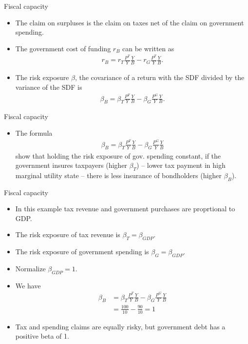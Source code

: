 \documentclass[11pt,xcolor={dvipsnames},aspectratio=159,hyperref={pdftex,pdfpagemode=UseNone,hidelinks,pdfdisplaydoctitle=true},usepdftitle=false]{beamer}
\begin{document}
\begin{frame}{Fiscal capacity}  
    \begin{itemize}
        \item The claim on surpluses is the claim on taxes net of the claim on government spending.
        \item The government cost of funding $r_B$ can be written as \begin{align*}
            r_B = r_T \frac{P^T}{Y}\frac{Y}{B} - r_G \frac{P^T}{Y}\frac{Y}{B}.
        \end{align*}
        \item The risk exposure $\beta$, the covariance of a return with the SDF divided by the variance of the SDF is \begin{align*}
            \beta_B = \beta_T \frac{P^T}{Y}\frac{Y}{B} - \beta_G \frac{P^G}{Y}\frac{Y}{B}. 
        \end{align*}
    \end{itemize}

\end{frame}

\begin{frame}{Fiscal capacity}  
    \begin{itemize}
        \item The formula \begin{align*}
            \beta_B = \beta_T \frac{P^T}{Y}\frac{Y}{B} - \beta_G \frac{P^G}{Y}\frac{Y}{B}
        \end{align*}
        show that holding the risk exposure of gov. spending constant, if the government insures taxpayers (higher
        $\beta_T$) --  lower tax payment in high marginal utility state -- there is less insurance
        of bondholders (higher $\beta_B$).
    \end{itemize}
\end{frame}

\begin{frame}{Fiscal capacity}  
    \begin{itemize}
        \item In this example tax revenue and government purchases are proprtional to GDP.
        \item The risk exposure of tax revenue is $\beta_T = \beta_{GDP}$.
        \item The risk exposure of government spending is $\beta_G = \beta_{GDP}$.
        \item Normalize $\beta_{GDP} = 1$.
        
        \item We have \begin{align*}
            \beta_B & =  \beta_T \frac{P^T}{Y}\frac{Y}{B} - \beta_G \frac{P^G}{Y}\frac{Y}{B} \\
            & = \frac{100}{10} - \frac{90}{10}  = 1
        \end{align*}
        \item  Tax and spending claims are equally risky, but government debt has a
        positive beta of 1.
    \end{itemize}
\end{frame}
\end{document}

